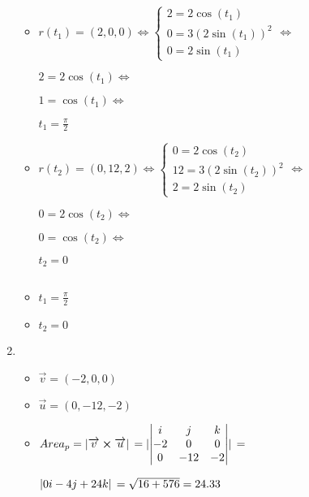 \documentclass[../parcial.tex]{subfiles}
\begin{document}
\begin{enumerate}
            \begin{itemize}
                \item  $r(t_1) = (2,0,0) \Leftrightarrow \left\{
                    \begin{array}{ll}
                        2 = 2\cos(t_1) \\
                        0 = 3(2\sin(t_1))^2 \\
                        0 = 2\sin(t_1)
                    \end{array}
                    \right. \Leftrightarrow$
                    
                    $ 2 = 2\cos(t_1) \Leftrightarrow $
                    
                    $ 1 = \cos(t_1) \Leftrightarrow $
                    
                    $ t_1 = \frac{\pi}{2} $

                \item $r(t_2) = (0,12,2) \Leftrightarrow \left\{
                    \begin{array}{ll}
                        0 = 2\cos(t_2) \\
                        12 = 3(2\sin(t_2))^2 \\
                        2 = 2\sin(t_2)
                    \end{array}
                    \right. \Leftrightarrow$
                    
                    $ 0 = 2\cos(t_2) \Leftrightarrow $
                    
                    $ 0 = \cos(t_2) \Leftrightarrow $
                    
                    $ t_2 = 0 $
            \end{itemize}

            $ $

            \begin{itemize}
                \item $t_1 = \frac{\pi}{2}$
                \item $t_2 = 0$
            \end{itemize}

        \item 

            \begin{itemize}
                \item $\overrightarrow{v}=(-2,0,0)$
                \item $\overrightarrow{u}=(0,-12,-2)$
                \item $Area_p = \abs*{\overrightarrow{v} \crossproduct \overrightarrow{u}} = \abs*{\begin{vmatrix}
                    i & j & k \\
                    -2 & 0 & 0 \\
                    0 & -12 & -2
                \end{vmatrix}} = $

                $\abs*{0i -4j + 24k} = \sqrt{16+576} = 24.33 $

            \end{itemize}

    \end{enumerate}
\end{document}

